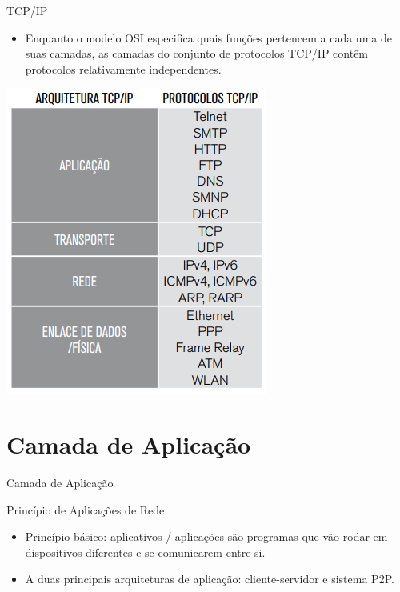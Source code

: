 \documentclass{libs/ufc_format}
\begin{document}
\begin{frame}{TCP/IP}
    \begin{itemize}
        \justifying
        \item Enquanto o modelo OSI especifica quais funções pertencem a cada uma de suas camadas, as camadas do conjunto de protocolos TCP/IP contêm protocolos relativamente independentes.
    \end{itemize}
    \centering
    \includegraphics[scale=0.6]{media/TCP_IP}
\end{frame}

\section{Camada de Aplicação}

\begin{frame}{}
    \centering
    \Large
    Camada de Aplicação
\end{frame}

\begin{frame}{Princípio de Aplicações de Rede}
    \begin{itemize}
        \justifying
        \item Princípio básico: aplicativos / aplicações são programas que vão rodar em dispositivos diferentes e se comunicarem entre si.
        \item A duas principais arquiteturas de aplicação: cliente-servidor e sistema P2P.
    \end{itemize}
\end{frame}
\end{document}
